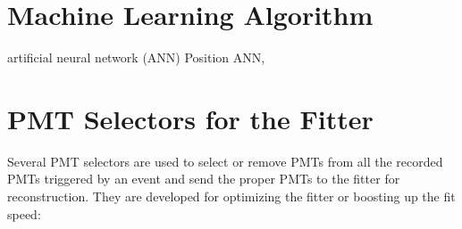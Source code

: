 \section{Machine Learning Algorithm}

artificial neural network (ANN)
Position ANN,


\cite{neuronetwork}






\section{PMT Selectors for the Fitter}
Several PMT selectors are used to select or remove PMTs from all the recorded PMTs triggered by an event and send the proper PMTs to the fitter for reconstruction. They are developed for optimizing the fitter or boosting up the fit speed:

